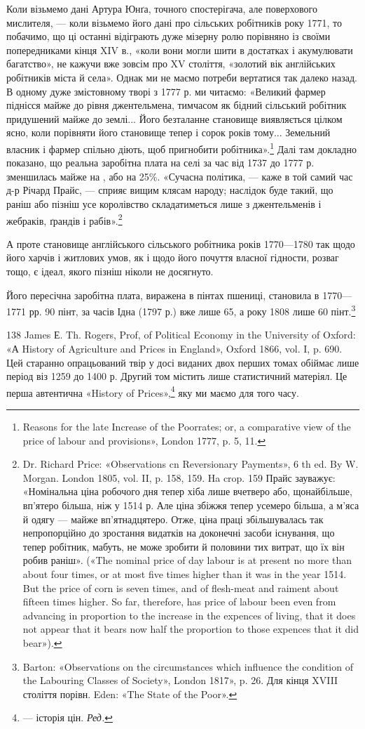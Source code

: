 Коли візьмемо дані Артура Юнґа, точного спостерігача, але
поверхового мислителя, — коли візьмемо його дані про сільських
робітників року 1771, то побачимо, що ці останні відіграють дуже
мізерну ролю порівняно із своїми попередниками кінця XIV в.,
«коли вони могли шити в достатках і акумулювати багатство»,
не кажучи вже зовсім про XV століття, «золотий вік англійських
робітників міста й села». Однак ми не маємо потреби
вертатися так далеко назад. В одному дуже змістовному творі
з 1777 р. ми читаємо: «Великий фармер піднісся майже до рівня
джентельмена, тимчасом як бідний сільський робітник придушений
майже до землі... Його безталанне становище виявляється
цілком ясно, коли порівняти його становище тепер і сорок років
тому... Земельний власник і фармер спільно діють, щоб пригнобити
робітника».\footnote{
Reasons for the late Increase of the Poorrates; or, a comparative
view of the price of labour and provisions», London 1777, p. 5, 11.
} Далі там докладно показано, що реальна
заробітна плата на селі за час від 1737 до 1777 р. зменшилась
майже на ,  або на 25\%. «Сучасна політика, — каже в той самий
час д-р Річард Прайс, — сприяє вищим клясам народу; наслідок
буде такий, що раніш або пізніш усе королівство складатиметься
лише з джентельменів і жебраків, ґрандів і рабів».\footnote{
Dr. Richard Price: «Observations cn Reversionary Payments»,
6 th ed. By W. Morgan. London 1805, vol. II, p. 158, 159. Ha crop. 159
Прайс зауважує: «Номінальна ціна робочого дня тепер хіба лише вчетверо
або, щонайбільше, вп’ятеро більша, ніж у 1514 р. Але ціна збіжжя тепер
усемеро більша, а м’яса й одягу — майже вп’ятнадцятеро. Отже, ціна
праці збільшувалась так непропорційно до зростання видатків на доконечні
засоби існування, що тепер робітник, мабуть, не може зробити й
половини тих витрат, що їх він робив раніш». («The nominal price of
day labour is at present no more than about four times, or at most five times
higher than it was in the year 1514. But the price of corn is seven times,
and of flesh-meat and raiment about fifteen times higher. So far, therefore,
has price of labour been even from advancing in proportion to the
increase in the expences of living, that it does not appear that it bears now
half the proportion to those expences that it did bear»).
}

А проте становище англійського сільського робітника років
1770—1780 так щодо його харчів і житлових умов, як і щодо
його почуття власної гідности, розваг тощо, є ідеал, якого пізніш
ніколи не досягнуто.

Його пересічна заробітна плата, виражена в пінтах пшениці,
становила в 1770—1771 рр. 90 пінт, за часів Ідна (1797 р.)
вже лише 65, а року 1808 лише 60 пінт.\footnote{
Barton: «Observations on the circumstances which influence the
condition of the Labouring Classes of Society», London 1817», p. 26. Для
кінця XVIII століття порівн. Eden: «The State of the Poor».
}

138 James Е. Th. Rogers, Prof, of Political Economy in the University
of Oxford: «А History of Agriculture and Prices in England», Oxford
1866, vol. I, p. 690. Цей старанно опрацьований твір у досі виданих двох
перших томах обіймає лише період віз 1259 до 1400 р. Другий том містить
лише статистичний матеріял. Це перша автентична «History of Prices»,\footnote*{
— історія цін. \emph{Ред.}
}
яку ми маємо для того часу.